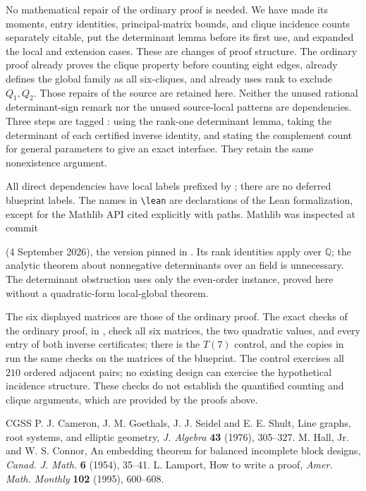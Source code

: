 \documentclass[11pt]{amsart}
\newcommand\rats{{\mathbb Q}}
\begin{document}
No mathematical repair of the ordinary proof is needed.
We have made its moments, entry identities, principal-matrix bounds,
and clique incidence counts separately citable, put the determinant
lemma before its first use, and expanded the local and extension
cases. These are changes of proof structure. The ordinary
proof already proves the clique property before counting eight
edges, already defines the global family as all six-cliques, and
already uses rank to exclude $Q_1,Q_2$. Those repairs of the source
are retained here. Neither the unused rational determinant-sign
remark nor the unused source-local patterns are dependencies.
Three steps are tagged \new: using the rank-one determinant lemma,
taking the determinant of each certified inverse identity, and
stating the complement count for general parameters to give
 an exact interface. They retain the same
nonexistence argument.

All direct dependencies have local labels prefixed by
; there are no deferred blueprint labels. The names in
\verb|\lean| are declarations of the Lean formalization, except for the
Mathlib API cited explicitly with paths. Mathlib
was inspected at commit
\par\noindent{}\par\noindent
(4 September 2026), the version pinned in .
Its rank identities apply over $\rats$; the analytic theorem about
nonnegative determinants over an  field is unnecessary.
The determinant obstruction uses only the even-order instance,
proved here without a quadratic-form local-global theorem.

The six displayed matrices are those of the ordinary proof. The exact
checks of the ordinary proof, in , check all
six matrices, the two quadratic values, and every entry of both inverse
certificates;  there is the $T(7)$ control, and the copies
in  run the same checks on the matrices of
the blueprint. The control
exercises all $210$ ordered adjacent pairs; no existing design can
exercise the hypothetical incidence structure. These checks do not
establish the quantified counting and clique arguments, which are
provided by the proofs above.

\begin{thebibliography}{CGSS}
 P. J. Cameron, J. M. Goethals, J. J. Seidel and
 E. E. Shult, Line graphs, root systems, and elliptic geometry,
 \emph{J. Algebra} \textbf{43} (1976), 305--327.
 M. Hall, Jr. and W. S. Connor,
 An embedding theorem for balanced incomplete block designs,
 \emph{Canad. J. Math.} \textbf{6} (1954), 35--41.
 L. Lamport, How to write a proof,
 \emph{Amer. Math. Monthly} \textbf{102} (1995), 600--608.
\end{thebibliography}
\end{document}
